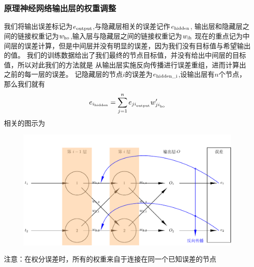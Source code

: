 \documentclass[12pt]{article}
\begin{document}
    \subsubsection{原理神经网络输出层的权重调整}
    我们将输出误差标记为$e_{\rm output}$,与隐藏层相关的误差记作$e_{\rm hidden}$,
    输出层和隐藏层之间的链接权重记为$w_{\rm ho}$,输入层与隐藏层之间的链接权重记为$w_{\rm ih}$
    现在的重点记为中间层的误差计算，但是中间层并没有明显的误差，因为我们没有目标值与希望输出的值。
    我们的训练数据给出了我们最终的节点目标值，并没有给出中间层的目标值，所以对此我们的方法就是
    从输出层实施反向传播进行误差重组，进而计算出之前的每一层的误差。
    记隐藏层的节点$i$的误差为$e_{\rm hidden\_i}$,设输出层有$n$个节点，那么我们就有
    \begin{equation}
        e_{{i}_{\rm hidden}}=
        \sum_{j=1}^{n}{e_{{ji}_{\rm output}}w'_{{ji}_{\rm ho}}}
        \label{ei误差}
    \end{equation}
    相关的图示为
    \begin{figure}[!htb]
        \centering
        \includegraphics[scale=0.5]{picture/gapsDistrio.pdf}
    \end{figure}
    注意：在权分误差时，所有的权重来自于连接在同一个已知误差的节点
\end{document}
